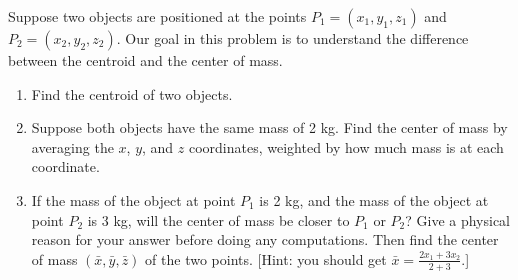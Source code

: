 \begin{problem}%
 Suppose two objects are positioned at the points $P_1=(x_1,y_1,z_1)$ and $P_2=(x_2,y_2,z_2)$.
 Our goal in this problem is to understand the difference between the centroid and the center of mass.
\begin{enumerate}
\item Find the centroid of two objects.
 \item Suppose both objects have the same mass of 2 kg.  Find the center of mass by averaging the $x$, $y$, and $z$ coordinates, weighted by how much mass is at each coordinate.
 \item If the mass of the object at point $P_1$ is 2 kg, and the mass of the object at point $P_2$ is 3 kg, will the center of mass be closer to $P_1$ or $P_2$? Give a physical reason for your answer before doing any computations.  Then find the center of mass $(\bar x, \bar y, \bar z)$ of the two points. [Hint: you should get $\bar x= \frac{2x_1+3x_2}{2+3}$.] 
\end{enumerate}
\end{problem}


